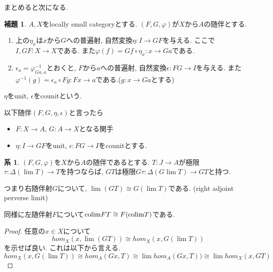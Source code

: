 \documentclass[dvipdfmx,a4paper,11pt]{article}
\newcommand{\colim}{{\rm colim}}
\theoremstyle{definition}
\newtheorem{lem}[thm]{補題}
\newtheorem{cor}[thm]{系}
\begin{document}
まとめると次になる. 
 \begin{tcolorbox}
 [colback = white, colframe = green!35!black, fonttitle = \bfseries,breakable = true]
\begin{lem}
$A,X$をlocally small categoryとする.
$(F,G,\varphi)$が$X$から$A$の随伴とする.
\begin{enumerate}
\item 上の$\eta_{x}$は$x$から$G$への普遍射, 自然変換$\eta : I \to GF$を与える. ここで$I, GF: X \to X$である.
また$\varphi(f ) = Gf \circ \eta_x : x \to Ga$である.
\item $\epsilon_a = \varphi^{-1}_{Ga,a}$とおくと, $F$から$a$への普遍射, 自然変換$\epsilon : FG \to I$を与える. また$\varphi^{-1}(g) = \epsilon_{a} \circ Fg:  Fx \to a$である.($g : x \to Ga$とする)
\end{enumerate}
$\eta$をunit, $\epsilon$をcounitという. 
\end{lem}
\end{tcolorbox}
以下随伴$(F,G,\eta,\epsilon)$と言ったら
\begin{itemize}
\item $F :X \to A$, $G : A \to X$となる関手
\item $\eta : I \to GF$をunit, $\epsilon : FG \to I$をcounitとする.
\end{itemize}


 \begin{tcolorbox}
 [colback = white, colframe = green!35!black, fonttitle = \bfseries,breakable = true]
\begin{cor}
$(F,G,\varphi)$を$X$から$A$の随伴であるとする. 
$T : J \to A$が極限$\tau : \Delta (\lim T) \to T$を持つならば, 
$GT$は極限$G\tau : \Delta (G \lim T) \to GT$と持つ.

つまり右随伴射$G$について, $\lim (GT) \cong G(\lim T)$である.
(right adjoint perverse limit)
\end{cor}
\end{tcolorbox}

同様に左随伴射$F$について$\colim FT \cong F(\colim T)$である.
\begin{proof}
任意の$x \in X$について
$$
hom_{X}(x, \lim (GT) ) \cong 
hom_{X}(x, G(\lim T)) 
$$
を示せば良い. これは以下から言える. 
$$
hom_{X}(x, G(\lim T)) 
\cong
hom_{A}(Gx, T) 
\cong
\lim  hom_{A}(Gx, T) )
 \cong 
\lim hom_{X}(x, GT)
$$
\end{proof}
\end{document}
